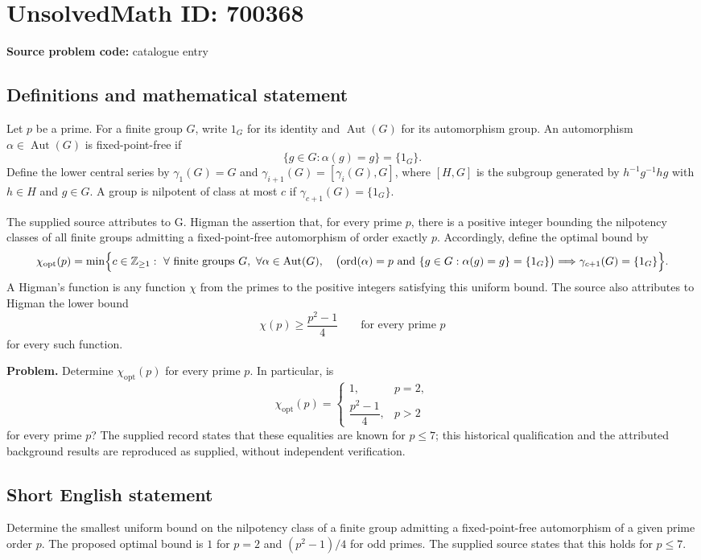 \documentclass[11pt]{article}
\newcommand{\Z}{\mathbb{Z}}
\begin{document}
\section*{UnsolvedMath ID: 700368}
\textbf{Source problem code:} catalogue entry
\subsection{Definitions and mathematical statement}
Let \(p\) be a prime. For a finite group \(G\), write \(1_G\) for its identity and \(\operatorname{Aut}(G)\) for its automorphism group. An automorphism \(\alpha\in\operatorname{Aut}(G)\) is fixed-point-free if
\[
\{g\in G:\alpha(g)=g\}=\{1_G\}.
\]
Define the lower central series by \(\gamma_1(G)=G\) and \(\gamma_{i+1}(G)=[\gamma_i(G),G]\), where \([H,G]\) is the subgroup generated by \(h^{-1}g^{-1}hg\) with \(h\in H\) and \(g\in G\). A group is nilpotent of class at most \(c\) if \(\gamma_{c+1}(G)=\{1_G\}\).

The supplied source attributes to G. Higman the assertion that, for every prime \(p\), there is a positive integer bounding the nilpotency classes of all finite groups admitting a fixed-point-free automorphism of order exactly \(p\). Accordingly, define the optimal bound by
\[
\chi_{\mathrm{opt}}(p)=\min\Bigl\{c\in\Z_{\geq1}:\ \forall\text{ finite groups }G,\ \forall\alpha\in\operatorname{Aut}(G),\quad
\bigl(\operatorname{ord}(\alpha)=p\ \text{and}\ \{g\in G:\alpha(g)=g\}=\{1_G\}\bigr)
\Longrightarrow\gamma_{c+1}(G)=\{1_G\}\Bigr\}.
\]
A Higman's function is any function \(\chi\) from the primes to the positive integers satisfying this uniform bound. The source also attributes to Higman the lower bound
\[
\chi(p)\geq\frac{p^2-1}{4}
\qquad\text{for every prime }p
\]
for every such function.

\textbf{Problem.} Determine \(\chi_{\mathrm{opt}}(p)\) for every prime \(p\). In particular, is
\[
\chi_{\mathrm{opt}}(p)=
\begin{cases}
1,&p=2,\\
\dfrac{p^2-1}{4},&p>2
\end{cases}
\]
for every prime \(p\)? The supplied record states that these equalities are known for \(p\leq7\); this historical qualification and the attributed background results are reproduced as supplied, without independent verification.
\subsection{Short English statement}
Determine the smallest uniform bound on the nilpotency class of a finite group admitting a fixed-point-free automorphism of a given prime order \(p\). The proposed optimal bound is \(1\) for \(p=2\) and \((p^2-1)/4\) for odd primes. The supplied source states that this holds for \(p\leq7\).
\end{document}
